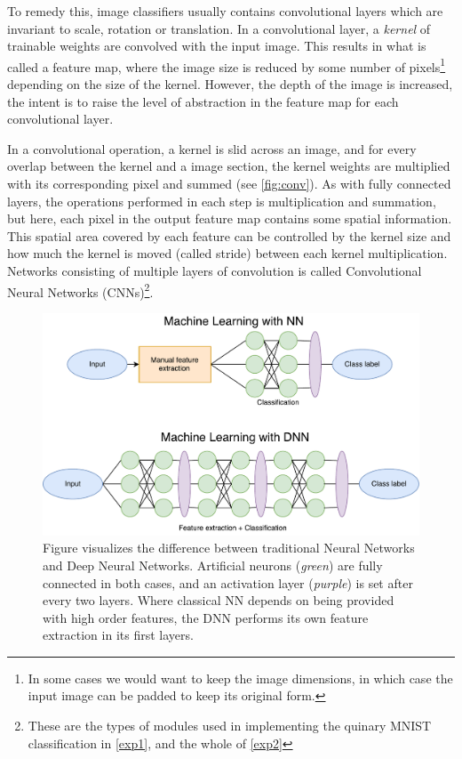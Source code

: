 To remedy this, image classifiers usually contains convolutional layers which are invariant to scale, rotation or translation. In a convolutional layer, a \textit{kernel} of trainable weights are convolved with the input image. This results in what is called a feature map, where the image size is reduced by some number of pixels\footnote{In some cases we would want to keep the image dimensions, in which case the input image can be padded to keep its original form.} depending on the size of the kernel. However, the depth of the image is increased, the intent is to raise the level of abstraction in the feature map for each convolutional layer. 

In a convolutional operation, a kernel is slid across an image, and for every overlap between the kernel and a image section, the kernel weights are multiplied with its corresponding pixel and summed (see \ref{fig:conv}). As with fully connected layers, the operations performed in each step is multiplication and summation, but here, each pixel in the output feature map contains some spatial information.
This spatial area covered by each feature can be controlled by the kernel size and how much the kernel is moved (called stride) between each kernel multiplication.
Networks consisting of multiple layers of convolution is called Convolutional Neural Networks (CNNs)\footnote{These are the types of modules used in implementing the quinary MNIST classification in \ref{exp1}, and the whole of \ref{exp2}}.

\begin{figure}[ht] 
    \centering
    \includegraphics[width=0.8\linewidth]{Chapters/2.Background/figures/NNvsDNN.pdf}
    \caption[NN vs DNN]{Figure visualizes the difference between traditional Neural Networks and Deep Neural Networks. Artificial neurons (\textit{green}) are fully connected in both cases, and an activation layer (\textit{purple}) is set after every two layers. Where classical NN depends on being provided with high order features, the DNN performs its own feature extraction in its first layers.}
    \label{fig:NNvsDNN}
\end{figure}

